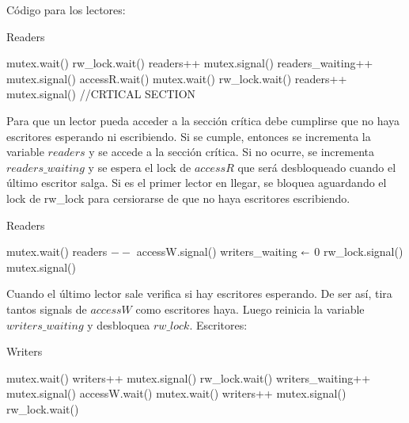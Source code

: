 Código para los lectores:

\begin{algorithm}[H]
\caption{Readers}\label{ej1}
\begin{algorithmic}[1]
	\State mutex.wait()
			\State rw\_lock.wait()
		\EndIf
		\State readers++
		\State mutex.signal()
	\Else
		\State readers\_waiting++
		\State mutex.signal()
		\State accessR.wait()
		\State mutex.wait()
			\State rw\_lock.wait()
		\EndIf
		\State readers++
		\State mutex.signal()
	\EndIf
	\State //CRTICAL SECTION
	
\EndProcedure
\end{algorithmic}
\end{algorithm}

Para que un lector pueda acceder a la sección crítica debe cumplirse que no haya escritores esperando ni escribiendo. Si se cumple, entonces se incrementa la variable $readers$ y se accede a la sección crítica. Si no ocurre, se incrementa $readers\_waiting$ y se espera el lock de $accessR$ que será desbloqueado cuando el último escritor salga. Si es el primer lector en llegar, se bloquea aguardando el lock de rw\_lock para cersiorarse de que no haya escritores escribiendo.

\begin{algorithm}[H]
\caption{Readers}\label{ej1}
\begin{algorithmic}[1]
	\State mutex.wait()
	\State readers $--$
				\State accessW.signal()
			\EndFor
			\State writers\_waiting $\shortleftarrow$ 0
			\State rw\_lock.signal()
		\EndIf
	\EndIf
	\State mutex.signal()
\EndProcedure
\end{algorithmic}
\end{algorithm}

Cuando el último lector sale verifica si hay escritores esperando. De ser así, tira tantos signals de $accessW$ como escritores haya. Luego reinicia la variable $writers\_waiting$ y desbloquea $rw\_lock$. Escritores:

\begin{algorithm}[H]
\caption{Writers}\label{ej1}
\begin{algorithmic}[1]
	\State mutex.wait()
		\State writers++
		\State mutex.signal()
		\State rw\_lock.wait()
	\Else
		\State writers\_waiting++
		\State mutex.signal()
		\State accessW.wait()
		\State mutex.wait()
		\State writers++
		\State mutex.signal()
		\State rw\_lock.wait()
	\EndIf
\EndProcedure
\end{algorithmic}
\end{algorithm}

